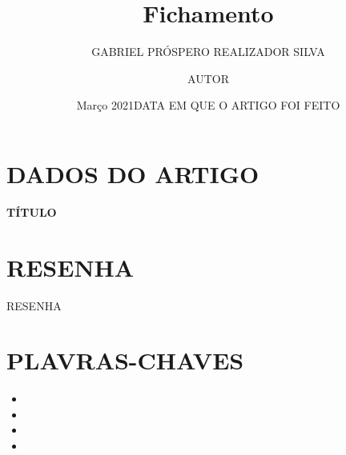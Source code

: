 \documentclass{article}
\title{Fichamento}
\author{GABRIEL PRÓSPERO REALIZADOR  SILVA}
\date{Março 2021}
\begin{document}
\maketitle

\section{DADOS DO ARTIGO}
\textbf{TÍTULO \\}
\author{AUTOR \\}
\date{DATA EM QUE O ARTIGO FOI FEITO}

\section{RESENHA}
RESENHA

\section{PLAVRAS-CHAVES}
\begin{itemize}
    \item 
    \item 
    \item 
    \item 
\end{itemize}
\end{document}
